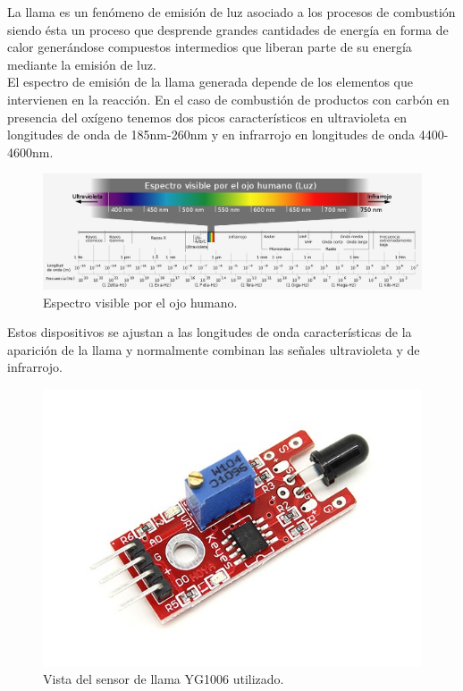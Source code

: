 La llama es un fenómeno de emisión de luz asociado a los procesos de combustión siendo ésta un proceso que desprende grandes cantidades de energía en forma de calor generándose
compuestos intermedios que liberan parte de su energía mediante la emisión de luz.\\

El espectro de emisión de la llama generada depende de los elementos que intervienen en la reacción. En el caso de combustión de productos con carbón en presencia del oxígeno 
tenemos dos picos característicos en ultravioleta en longitudes de onda de 185nm-260nm y en infrarrojo en longitudes de onda 4400-4600nm.\\

\begin{figure}[H]
  \begin{center}
    \includegraphics[scale=0.4]{imagenes/espectro.png}
  \end{center}
  \caption{Espectro visible por el ojo humano.}
  \label{fig:}
\end{figure}

Estos dispositivos se ajustan a las longitudes de onda características de la aparición de la llama y normalmente combinan las señales ultravioleta y de infrarrojo.\\
 
 \begin{figure}[H]
  \begin{center}
    \includegraphics[scale=0.4]{imagenes/sensor_llama.jpg}
  \end{center}
  \caption{Vista del sensor de llama YG1006 utilizado.}
  \label{figura:sensor_mq_2_potenciometro}
\end{figure}

